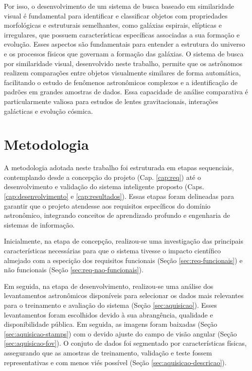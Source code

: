 Por isso, o desenvolvimento de um sistema de busca baseado em similaridade visual é fundamental para identificar e classificar objetos com propriedades morfológicas e estruturais semelhantes, como galáxias espirais, elípticas e irregulares, que possuem características específicas associadas a sua formação e evolução. Esses aspectos são fundamentais para entender a estrutura do universo e os processos físicos que governam a formação das galáxias. O sistema de busca por similaridade visual, desenvolvido neste trabalho, permite que os astrônomos realizem comparações entre objetos visualmente similares de forma automática, facilitando o estudo de fenômenos astronômicos complexos e a identificação de padrões em grandes amostras de dados. Essa capacidade de análise comparativa é particularmente valiosa para estudos de lentes gravitacionais, interações galácticas e evolução cósmica.



\section{Metodologia}
\label{sec:metodologia}

A metodologia adotada neste trabalho foi estruturada em etapas sequenciais, contemplando desde a concepção do projeto (Cap. \ref{cap:req}) até o desenvolvimento e validação do sistema inteligente proposto (Caps. \ref{cap:desenvolvimento} e \ref{cap:resultados}). Essas etapas foram delineadas para garantir que o projeto atendesse aos requisitos específicos do domínio astronômico, integrando conceitos de aprendizado profundo e engenharia de sistemas de informação.

Inicialmente, na etapa de concepção, realizou-se uma investigação das principais características necessárias para que o sistema tivesse o impacto científico almejado com a especição dos requisitos funcionais (Seção \ref{sec:req-funcionais}) e não funcionais (Seção \ref{sec:req-nao-funcionais}).

Em seguida, na etapa de desenvolvimento, realizou-se uma análise dos levantamentos astronômicos disponíveis para selecionar os dados mais relevantes para o treinamento e avaliação do sistema (Seção \ref{sec:aquisicao}). Esses levantamentos foram escolhidos devido à sua abrangência, qualidade e disponibilidade pública. Em seguida, as imagens foram baixadas (Seção \ref{sec:aquisicao-stamps}) com o devido ajuste do campo de visão angular (Seção \ref{sec:aquisicao-fov}). O conjuto de dados foi segmentado por características físicas, assegurando que as amostras de treinamento, validação e teste fossem representativas e com menos viés possível (Seção \ref{sec:aquisicao-descricao}).

